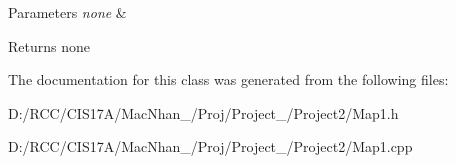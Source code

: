\begin{DoxyParams}{Parameters}
{\em none} & \\
\hline
\end{DoxyParams}
\begin{DoxyReturn}{Returns}
none 
\end{DoxyReturn}


The documentation for this class was generated from the following files\+:\begin{DoxyCompactItemize}
\item 
D\+:/\+R\+C\+C/\+C\+I\+S17\+A/\+Mac\+Nhan\+\_/\+Proj/\+Project\+\_/\+Project2/Map1.\+h\item 
D\+:/\+R\+C\+C/\+C\+I\+S17\+A/\+Mac\+Nhan\+\_/\+Proj/\+Project\+\_/\+Project2/Map1.\+cpp\end{DoxyCompactItemize}
